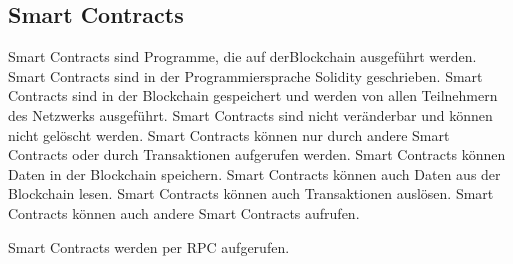 \subsection{Smart Contracts}
Smart Contracts sind Programme, die auf derBlockchain ausgeführt werden. Smart Contracts 
sind in der Programmiersprache Solidity geschrieben. Smart Contracts sind in der Blockchain
gespeichert und werden von allen Teilnehmern des Netzwerks ausgeführt. Smart Contracts sind
nicht veränderbar und können nicht gelöscht werden. Smart Contracts können nur durch andere
Smart Contracts oder durch Transaktionen aufgerufen werden. Smart Contracts können Daten
in der Blockchain speichern. Smart Contracts können auch Daten aus der Blockchain lesen.
Smart Contracts können auch Transaktionen auslösen. Smart Contracts können auch andere
Smart Contracts aufrufen.

Smart Contracts werden per RPC aufgerufen.